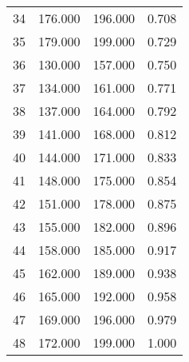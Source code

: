 \begin{tabular}{cccc}
  34 & 176.000 & 196.000 & 0.708 \\ 
  35 & 179.000 & 199.000 & 0.729 \\ 
  36 & 130.000 & 157.000 & 0.750 \\ 
  37 & 134.000 & 161.000 & 0.771 \\ 
  38 & 137.000 & 164.000 & 0.792 \\ 
  39 & 141.000 & 168.000 & 0.812 \\ 
  40 & 144.000 & 171.000 & 0.833 \\ 
  41 & 148.000 & 175.000 & 0.854 \\ 
  42 & 151.000 & 178.000 & 0.875 \\ 
  43 & 155.000 & 182.000 & 0.896 \\ 
  44 & 158.000 & 185.000 & 0.917 \\ 
  45 & 162.000 & 189.000 & 0.938 \\ 
  46 & 165.000 & 192.000 & 0.958 \\ 
  47 & 169.000 & 196.000 & 0.979 \\ 
  48 & 172.000 & 199.000 & 1.000 \\ 
   \hline
\end{tabular}
